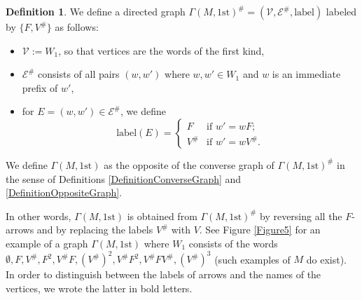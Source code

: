 \documentclass[12pt]{amsart}
\theoremstyle{definition}
\newtheorem{definition}[theorem]{Definition}
\newcommand{\<}{\langle}   %
\renewcommand{\>}{\rangle} %
\begin{document}
\begin{definition}
    We define a directed graph $\Gamma(M,1\mathrm{st})^{\#} = (\mathcal V,\mathcal E^{\#},\mathrm{label})$ labeled by $\{F,V^{\#}\}$ as follows:
    \begin{itemize}
        \item $\mathcal V := W_1$, so that vertices are the words of the first kind,
        \item $\mathcal E^{\#}$ consists of all pairs $(w,w')$ where $w, w' \in W_1$ and $w$ is an immediate prefix of $w'$,
        \item for $E = (w,w') \in \mathcal E^{\#}$, we define 
        \begin{equation*}
            \mathrm{label}(E) = \begin{cases}
                F & \text{if } w' = wF;\\
                V^{\#} & \text{if } w' = wV^{\#}.
            \end{cases}
        \end{equation*}
    \end{itemize}
    We define $\Gamma(M,1\mathrm{st})$ as the opposite of the converse graph of $\Gamma(M,1\mathrm{st})^{\#}$ in the sense of Definitions \ref{DefinitionConverseGraph} and \ref{DefinitionOppositeGraph}.
\end{definition}

\sloppy In other words, $\Gamma(M,1\mathrm{st})$ is obtained from $\Gamma(M,1\mathrm{st})^{\#}$ by reversing all the $F$-arrows and by replacing the labels $V^{\#}$ with $V$. See Figure \ref{Figure5} for an example of a graph $\Gamma(M,1\mathrm{st})$ where $W_1$ consists of the words $\emptyset, F, V^{\#}, F^2, V^{\#}F, (V^{\#})^2, V^{\#}F^2, V^{\#}FV^{\#}, (V^{\#})^3$ (such examples of $M$ do exist). In order to distinguish between the labels of arrows and the names of the vertices, we wrote the latter in bold letters.
\end{document}
